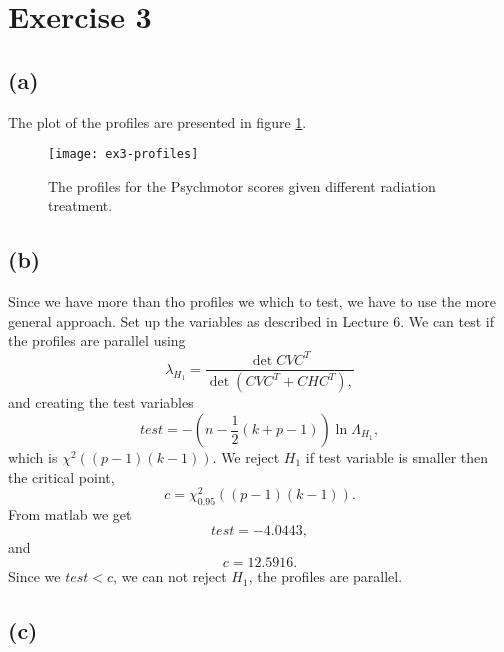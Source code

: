 \section*{Exercise 3}
\label{sec:exercise-3}

\subsection*{(a)}
\label{sec:a-2}
The plot of the profiles are presented in figure
\ref{fig:ex3-profiles}.
\begin{figure}[h]
  \centering
  \texttt{[image: ex3-profiles]}
  \caption{The profiles for the Psychmotor scores given different
    radiation treatment.}
  \label{fig:ex3-profiles}
\end{figure}

\subsection*{(b)}
\label{sec:b-2}


Since we have more than tho profiles we which to test, we have to use
the more general approach. Set up the variables as described in Lecture
6. We can test if the profiles are parallel using
\begin{equation*}
  \lambda_{H_1} = \frac{\det CVC^T}{\det( CVC^T  + CHC^T),}
\end{equation*}
and creating the test variables
\begin{equation*}
  test = -\left(n - \frac 12(k + p -1)\right) \ln \Lambda_{H_1},
\end{equation*}
which is $\chi^2((p-1)(k-1))$. We reject $H_1$ if test variable is
smaller then the critical point, 
\begin{equation*}
  c = \chi^2 _{0.95} ((p-1)(k-1)).
\end{equation*}
From matlab we get
\begin{equation*}
  test = -4.0443,
\end{equation*}
and
\begin{equation*}
    c = 12.5916.
\end{equation*}
Since we $test < c$, we can not reject $H_1$, the profiles are parallel.


\subsection*{(c)}
\label{sec:c-2}

